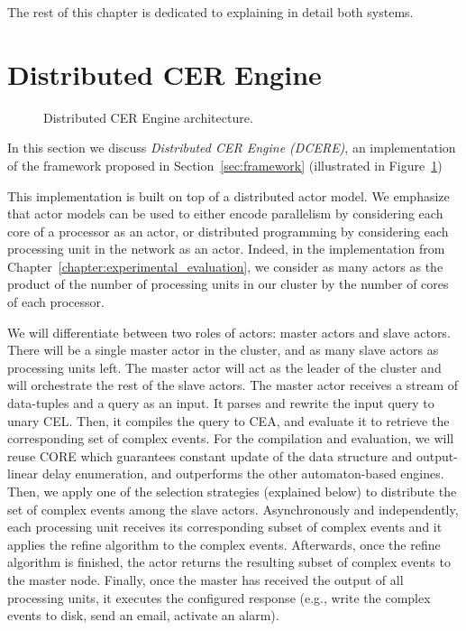 The rest of this chapter is dedicated to explaining in detail both systems.

\section{Distributed CER Engine}\label{sec:dcere}

\begin{figure}[H]
  \centering
  \caption{Distributed CER Engine architecture.}
  \label{fig:dcere}
\end{figure}

In this section we discuss \emph{Distributed CER Engine (DCERE)}, an implementation of the framework proposed in Section~\ref{sec:framework} (illustrated in Figure~\ref{fig:dcere})

This implementation is built on top of a distributed actor model. We emphasize that actor models can be used to either encode parallelism by considering each core of a processor as an actor, or distributed programming by considering each processing unit in the network as an actor. Indeed, in the implementation from Chapter~\ref{chapter:experimental_evaluation}, we consider as many actors as the product of the number of processing units in our cluster by the number of cores of each processor.

We will differentiate between two roles of actors: master actors and slave actors. There will be a single master actor in the cluster, and as many slave actors as processing units left. The master actor will act as the leader of the cluster and will orchestrate the rest of the slave actors. The master actor receives a stream of data-tuples and a query as an input. It parses and rewrite the input query to unary CEL. Then, it compiles the query to CEA, and evaluate it to retrieve the corresponding set of complex events. For the compilation and evaluation, we will reuse CORE \cite{core} which guarantees constant update of the data structure and output-linear delay enumeration, and outperforms the other automaton-based engines. Then, we apply one of the selection strategies (explained below) to distribute the set of complex events among the slave actors. Asynchronously and independently, each processing unit receives its corresponding subset of complex events and it applies the refine algorithm to the complex events. Afterwards, once the refine algorithm is finished, the actor returns the resulting subset of complex events to the master node. Finally, once the master has received the output of all processing units, it executes the configured response (e.g., write the complex events to disk, send an email, activate an alarm).

